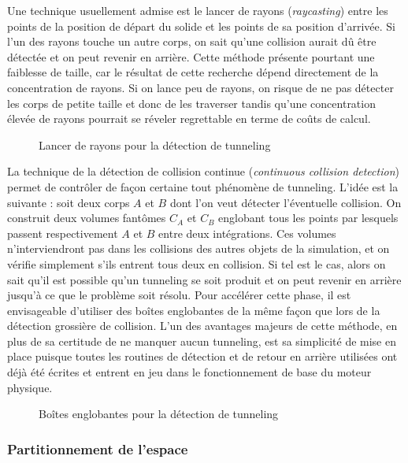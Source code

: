 Une technique usuellement admise est le lancer de rayons
(\textit{raycasting}) entre les points de la position de départ du
solide et les points de sa position d'arrivée. Si l'un des rayons
touche un autre corps, on sait qu'une collision aurait dû être
détectée et on peut revenir en arrière. Cette méthode présente
pourtant une faiblesse de taille, car le résultat de cette recherche
dépend directement de la concentration de rayons. Si on lance peu de
rayons, on risque de ne pas détecter les corps de petite taille et
donc de les traverser tandis qu'une concentration élevée de rayons
pourrait se réveler regrettable en terme de coûts de calcul.

\begin{figure}
  \centering
  
  \caption{Lancer de rayons pour la détection de tunneling}
  \label{tunneling2}
\end{figure}

La technique de la détection de collision continue (\textit{continuous
  collision detection}) permet de contrôler de façon certaine tout
phénomène de tunneling. L'idée est la suivante : soit deux corps $A$
et $B$ dont l'on veut détecter l'éventuelle collision. On construit
deux volumes fantômes $C_A$ et $C_B$ englobant tous les points par
lesquels passent respectivement $A$ et $B$ entre deux
intégrations. Ces volumes n'interviendront pas dans les collisions des
autres objets de la simulation, et on vérifie simplement s'ils entrent
tous deux en collision. Si tel est le cas, alors on sait qu'il est
possible qu'un tunneling se soit produit et on peut revenir en arrière
jusqu'à ce que le problème soit résolu. Pour accélérer cette phase, il
est envisageable d'utiliser des boîtes englobantes de la même façon
que lors de la détection grossière de collision. L'un des avantages
majeurs de cette méthode, en plus de sa certitude de ne manquer aucun
tunneling, est sa simplicité de mise en place puisque toutes les
routines de détection et de retour en arrière utilisées ont déjà été
écrites et entrent en jeu dans le fonctionnement de base du moteur
physique.

\begin{figure}
  \centering
  
  \caption{Boîtes englobantes pour la détection de tunneling}
  \label{tunneling3}
\end{figure}

\subsubsection{Partitionnement de l'espace}

